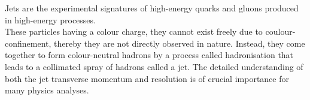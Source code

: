 Jets are the experimental signatures of high-energy quarks and gluons produced in high-energy processes.\\
These particles having a colour charge, they cannot exist freely due to coulour-confinement, thereby they are not
directly observed in nature. Instead, they come together to form colour-neutral hadrons by a process called
hadronisation that leads to a collimated spray of hadrons called a jet.
The detailed understanding of both the jet transverse momentum and resolution is of crucial importance for many physics analyses.

